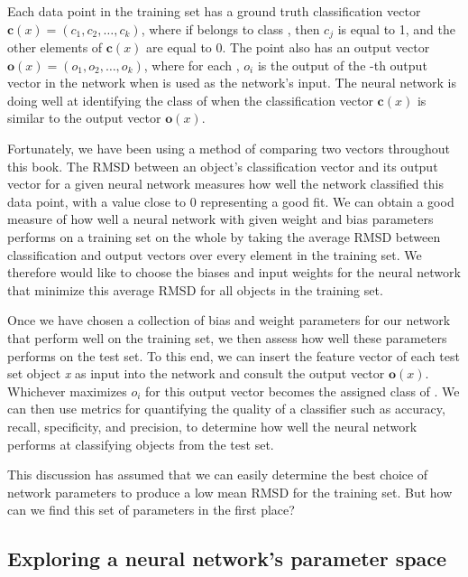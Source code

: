 Each data point  in the training set has a ground truth classification vector $\mathbf{c}(x) = (c_1, c_2, \ldots, c_k)$, where if  belongs to class , then $c_j$ is equal to 1, and the other elements of $\mathbf{c}(x)$ are equal to 0. The point  also has an output vector $\mathbf{o}(x) = (o_1, o_2, \ldots, o_k)$, where for each , $o_i$  is the output of the -th output vector in the network when  is used as the network's input. The neural network is doing well at identifying the class of  when the classification vector $\mathbf{c}(x)$ is similar to the output vector $\mathbf{o}(x)$.

Fortunately, we have been using a method of comparing two vectors throughout this book. The RMSD between an object's classification vector and its output vector for a given neural network measures how well the network classified this data point, with a value close to 0 representing a good fit. We can obtain a good measure of how well a neural network with given weight and bias parameters performs on a training set on the whole by taking the average RMSD between classification and output vectors over every element in the training set. We therefore would like to choose the biases and input weights for the neural network that minimize this average RMSD for all objects in the training set.

Once we have chosen a collection of bias and weight parameters for our network that perform well on the training set, we then assess how well these parameters performs on the test set. To this end, we can insert the feature vector of each test set object \textit{x} as input into the network and consult the output vector $\mathbf{o}(x)$. Whichever  maximizes $o_i$ for this output vector becomes the assigned class of . We can then use metrics for quantifying the quality of a classifier such as accuracy, recall, specificity, and precision, to determine how well the neural network performs at classifying objects from the test set.

This discussion has assumed that we can easily determine the best choice of network parameters to produce a low mean RMSD for the training set. But how can we find this set of parameters in the first place?

\subsection{Exploring a neural network's parameter space}

